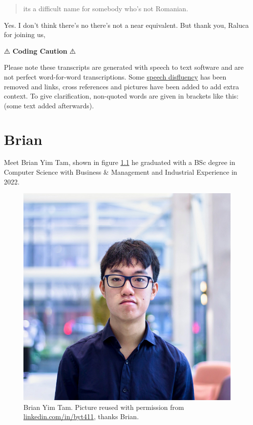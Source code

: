\documentclass[
]{book}
\begin{document}
\begin{quote}
its a difficult name for somebody who's not Romanian.
\end{quote}

Yes. I don't think there's no there's not a near equivalent. But thank you, Raluca for joining us,

⚠️ \textbf{Coding Caution} ⚠️

Please note these transcripts are generated with speech to text software and are not perfect word-for-word transcriptions. Some \href{https://en.wikipedia.org/wiki/Speech_disfluency}{speech disfluency} has been removed and links, cross references and pictures have been added to add extra context. To give clarification, non-quoted words are given in brackets like this: (some text added afterwards).

\hypertarget{brian}{%
\chapter{Brian}\label{brian}}

Meet Brian Yim Tam, shown in figure \ref{fig:brian-fig} he graduated with a BSc degree in Computer Science with Business \& Management and Industrial Experience in 2022.

\begin{figure}

{\centering \includegraphics[width=1\linewidth]{images/brian} 

}

\caption{Brian Yim Tam. Picture reused with permission from \href{hhttps://www.linkedin.com/in/byt411/}{linkedin.com/in/byt411}, thanks Brian.}\label{fig:brian-fig}
\end{figure}
\end{document}

